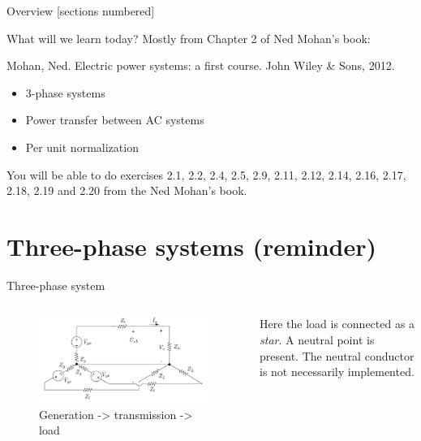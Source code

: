 \titleframe

\begin{frame}{Overview}
  [sections numbered]
  \tableofcontents[hideallsubsections]
\end{frame}


\begin{frame}{What will we learn today?}
    \small
    Mostly from Chapter 2 of Ned Mohan's book:

    \begin{center}
        Mohan, Ned. Electric power systems: a first course. John Wiley \& Sons, 2012.
    \end{center}

    \begin{itemize}
        \item 3-phase systems
        \item Power transfer between AC systems
        \item Per unit normalization
    \end{itemize}
    You will be able to do exercises 2.1, 2.2, 2.4, 2.5, 2.9, 2.11, 2.12, 2.14, 2.16, 2.17, 2.18, 2.19 and 2.20 from the Ned Mohan's book.
\end{frame}



\section{Three-phase systems (reminder)}
\begin{frame}{Three-phase system }
\begin{columns}
    \begin{column}{0.7\textwidth}
    \begin{figure}
        \centering
        \includegraphics[width=0.99\textwidth]{images/three-phase-system.png}
        \caption{Generation -> transmission -> load}
    \end{figure}
    \end{column}
    \begin{column}{0.3\textwidth}
    Here the load is connected as a \textit{star}. A neutral point is present. The neutral conductor is not necessarily implemented.
    \end{column}
\end{columns}
\end{frame}


